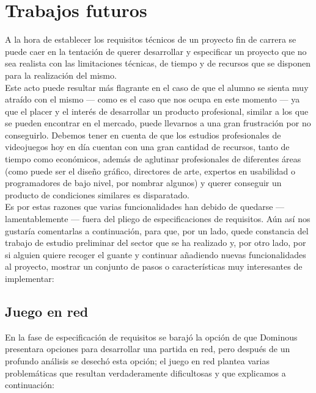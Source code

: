 \section{Trabajos futuros}

A la hora de establecer los requisitos técnicos de un proyecto fin de carrera se puede caer en la tentación de querer desarrollar y
especificar un proyecto que no sea realista con las limitaciones técnicas, de tiempo y de recursos que se disponen para la
realización del mismo. \\

Este acto puede resultar más flagrante en el caso de que el alumno se sienta muy atraído con el mismo --- como es el caso
que nos ocupa en este momento --- ya que el placer y el interés de desarrollar un producto profesional, similar a los que
se pueden encontrar en el mercado, puede llevarnos a una gran frustración por no conseguirlo. Debemos tener en cuenta de que
los estudios profesionales de videojuegos hoy en día cuentan con una gran cantidad de recursos, tanto de tiempo como
económicos, además de aglutinar profesionales de diferentes áreas (como puede ser el diseño gráfico, directores de arte,
expertos en usabilidad o programadores de bajo nivel, por nombrar algunos) y querer conseguir un producto de condiciones
similares es disparatado. \\

Es por estas razones que varias funcionalidades han debido de quedarse --- lamentablemente --- fuera del pliego de
especificaciones de requisitos. Aún así nos gustaría comentarlas a continuación, para que, por un lado, quede constancia
del trabajo de estudio preliminar del sector que se ha realizado y, por otro lado, por si alguien quiere recoger
el guante y continuar añadiendo nuevas funcionalidades al proyecto, mostrar un conjunto de pasos o características
muy interesantes de implementar:

\subsection{Juego en red}

En la fase de especificación de requisitos se barajó la opción de que Dominous presentara opciones para desarrollar una
partida en red, pero después de un profundo análisis se desechó esta opción; el juego en red plantea varias problemáticas
que resultan verdaderamente dificultosas y que explicamos a continuación:

